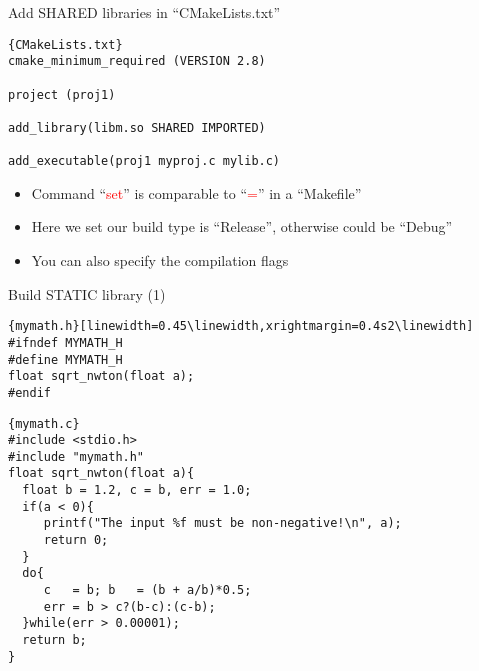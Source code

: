 \begin{frame}[fragile]{Add SHARED libraries in  ``CMakeLists.txt''}
\begin{lstlisting}[linewidth=0.95\linewidth, firstnumber= 1, xleftmargin=0.02\linewidth]{CMakeLists.txt}
cmake_minimum_required (VERSION 2.8)

project (proj1)

add_library(libm.so SHARED IMPORTED) 

add_executable(proj1 myproj.c mylib.c)

\end{lstlisting}

\begin{itemize}
	\item {Command ``\textcolor{red}{set}'' is comparable to ``\textcolor{red}{=}'' in a ``Makefile''}
	\item {Here we set our build type is ``Release'', otherwise could be ``Debug''}
	\item {You can also specify the compilation flags}
\end{itemize}
\end{frame}

\begin{frame}[fragile]{Build STATIC library (1)}
\vspace{-0.15in}
\begin{lstlisting}{mymath.h}[linewidth=0.45\linewidth,xrightmargin=0.4s2\linewidth]
#ifndef MYMATH_H
#define MYMATH_H
float sqrt_nwton(float a);
#endif
\end{lstlisting}
\vspace{-0.15in}
\begin{lstlisting}{mymath.c}
#include <stdio.h>
#include "mymath.h"
float sqrt_nwton(float a){
  float b = 1.2, c = b, err = 1.0;
  if(a < 0){
     printf("The input %f must be non-negative!\n", a);
     return 0;
  }
  do{
     c   = b; b   = (b + a/b)*0.5;
     err = b > c?(b-c):(c-b);
  }while(err > 0.00001);
  return b;
}
\end{lstlisting}
\end{frame}

